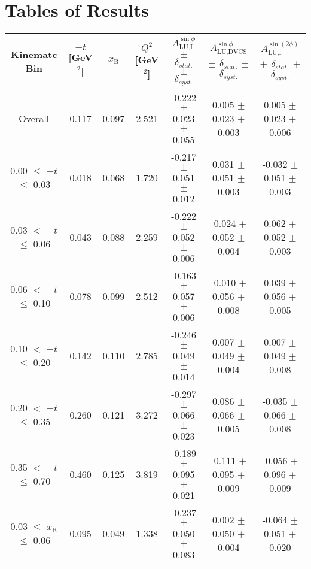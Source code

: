 \appendix
\appendixpage
\addappheadtotoc
\setcounter{equation}{0}

\section{Tables of Results}


\begin{table}[width=15cm]
 \begin{center}
\resizebox{16cm}{!} {
  \begin{tabular}{|c|c|c|c|c|c|c|}
\hline
Kinematc Bin &  $-t$ [GeV$^{2}$] & $x_{\textrm{B}}$ & $Q^{2}$ [GeV$^{2}$] & 
$A_{\textrm{LU,I}}^{\sin\phi}$ $\pm$ $\delta_{stat.}$ $\pm$ $\delta_{syst.}$ & $A_{\textrm{LU,DVCS}}^{\sin\phi}$ $\pm$ $\delta_{stat.}$ $\pm$ $\delta_{syst.}$
& $A_{\textrm{LU,I}}^{\sin(2\phi)}$ $\pm$ $\delta_{stat.}$ $\pm$ $\delta_{syst.}$ \\
\hline
\hline
Overall &  0.117 & 0.097 &  2.521 &  -0.222  $\pm$  0.023  $\pm$   0.055 &
 0.005  $\pm$  0.023  $\pm$  0.003 & 0.005  $\pm$  0.023  $\pm$   0.006 \\
\hline
0.00 $\leqslant$ $-t$ $\leqslant$ 0.03 &  0.018 & 0.068 &  1.720 &  -0.217  $\pm$  0.051  $\pm$   0.012 &
 0.031  $\pm$  0.051   $\pm$  0.003 & -0.032  $\pm$  0.051  $\pm$   0.003\\
0.03 $<$ $-t$ $\leqslant$ 0.06 &  0.043 & 0.088 &  2.259&  -0.222 $\pm$   0.052   $\pm$  0.006 &
 -0.024 $\pm$   0.052  $\pm$   0.004 & 0.062  $\pm$  0.052  $\pm$   0.003\\
0.06 $<$ $-t$ $\leqslant$ 0.10 &  0.078 & 0.099 &  2.512 & -0.163 $\pm$   0.057   $\pm$  0.006 &
 -0.010  $\pm$  0.056  $\pm$   0.008 & 0.039  $\pm$  0.056   $\pm$  0.005 \\
0.10 $<$ $-t$ $\leqslant$ 0.20 &  0.142 & 0.110 &  2.785 &  -0.246 $\pm$   0.049  $\pm$   0.014 &
0.007  $\pm$  0.049  $\pm$   0.004 & 0.007  $\pm$  0.049  $\pm$  0.008\\
0.20 $<$ $-t$ $\leqslant$ 0.35 &  0.260 & 0.121 &  3.272 &  -0.297 $\pm$   0.066  $\pm$   0.023 &
0.086  $\pm$  0.066  $\pm$   0.005 & -0.035 $\pm$   0.066   $\pm$  0.008\\
0.35 $<$ $-t$ $\leqslant$ 0.70 &  0.460 & 0.125 &  3.819 &  -0.189  $\pm$  0.095  $\pm$   0.021 & 
-0.111  $\pm$  0.095   $\pm$  0.009 & -0.056 $\pm$   0.096  $\pm$   0.009\\
\hline
0.03 $\leqslant$ $x_{\textrm{B}}$ $\leqslant$ 0.06 &  0.095 & 0.049 &  1.338 &  -0.237  $\pm$  0.050  $\pm$   0.083 &
0.002 $\pm$   0.050  $\pm$   0.004 & -0.064  $\pm$  0.051  $\pm$   0.020\\

\end{tabular}}
\end{center}
\end{table}
